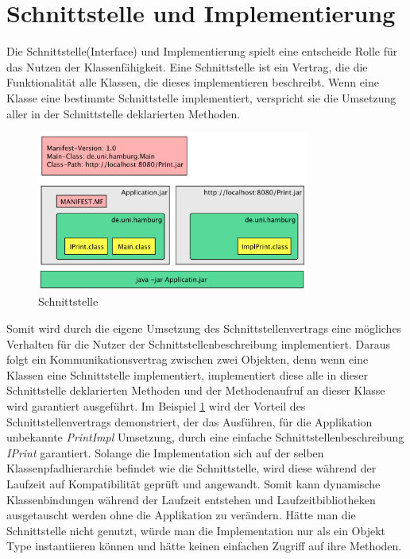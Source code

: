 \section{Schnittstelle und Implementierung}
\label{sub:Schnittstelle und Implementierung}
Die Schnittstelle(Interface) und Implementierung spielt eine entscheide Rolle für das Nutzen der Klassenfähigkeit.
Eine Schnittstelle ist ein Vertrag, die die Funktionalität alle Klassen, die dieses implementieren beschreibt. 
Wenn eine Klasse eine bestimmte Schnittstelle implementiert, verspricht sie die Umsetzung aller in der Schnittstelle deklarierten Methoden. 
\begin{figure}[h!]
  \centering
  \includegraphics[width=0.8\textwidth]{material/images/Interface.png}
  \caption{Schnittstelle}
  \label{fig:Schnittstelle}
\end{figure}
\newline
Somit wird durch die eigene Umsetzung des Schnittstellenvertrags eine mögliches Verhalten für die Nutzer der Schnittstellenbeschreibung implementiert. 
Daraus folgt ein Kommunikationsvertrag zwischen zwei Objekten, denn wenn eine Klassen eine Schnittstelle implementiert, implementiert diese alle in dieser Schnittstelle deklarierten Methoden und der Methodenaufruf an dieser Klasse wird garantiert ausgeführt. 
\newline
Im Beispiel \ref{fig:Schnittstelle} wird der Vorteil des Schnittstellenvertrags demonstriert, der das Ausführen, für die Applikation unbekannte \textit{PrintImpl} Umsetzung, durch eine einfache Schnittstellenbeschreibung \textit{IPrint} garantiert. Solange die Implementation sich auf der selben Klassenpfadhierarchie befindet wie die Schnittstelle, wird diese während der Laufzeit auf Kompatibilität geprüft und angewandt. Somit kann dynamische Klassenbindungen während der Laufzeit entstehen und Laufzeitbibliotheken ausgetauscht werden ohne die Applikation zu verändern. Hätte man die Schnittstelle nicht genutzt, würde man die Implementation nur als ein Objekt Type instantiieren können und hätte keinen einfachen Zugriff auf ihre Methoden.  


